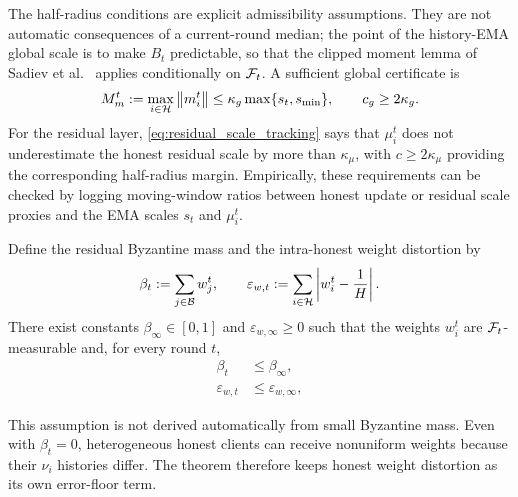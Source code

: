 \begin{remark}
\label{rem:avg_clip_budget}
The half-radius conditions are explicit admissibility assumptions. They are
not automatic consequences of a current-round median; the point of the
history-EMA global scale is to make \(B_t\) predictable, so that the clipped
moment lemma of Sadiev et al.~\cite[Lemma~5.1]{sadiev2023highprob} applies
conditionally on \(\mathcal{F}_t\). A sufficient global certificate is
\[
    M_m^t:=\max_{i\in\mathcal{H}}\left\lVert m_i^t \right\rVert
    \le \kappa_g\max\{s_t,s_{\min}\},
    \qquad
    c_g\ge 2\kappa_g .
\]
For the residual layer, \eqref{eq:residual_scale_tracking} says that
\(\mu_i^t\) does not underestimate the honest residual scale by more than
\(\kappa_\mu\), with \(c\ge2\kappa_\mu\) providing the corresponding
half-radius margin. Empirically, these requirements can be checked by logging
moving-window ratios between honest update or residual scale proxies and the
EMA scales \(s_t\) and \(\mu_i^t\).
\end{remark}

\begin{assumption}
\label{ass:beta_infty}
Define the residual Byzantine mass and the intra-honest weight distortion by
\begin{equation}
    \beta_t:=\sum_{j\in\mathcal{B}}w_j^t,
    \qquad
    \varepsilon_{w,t}
    :=
    \sum_{i\in\mathcal{H}}\left|w_i^t-\frac1H\right|.
    \label{eq:beta_epsw_def}
\end{equation}
There exist constants \(\beta_\infty\in[0,1]\) and
\(\varepsilon_{w,\infty}\ge 0\) such that the weights \(w_i^t\) are
\(\mathcal{F}_t\)-measurable and, for every round \(t\),
\begin{align}
    \beta_t &\le \beta_\infty,
    \label{eq:beta_infty}\\
    \varepsilon_{w,t} &\le \varepsilon_{w,\infty},
    \label{eq:epsw_beta_infty}
\end{align}
\end{assumption}

This assumption is not derived automatically from small Byzantine mass. Even
with \(\beta_t=0\), heterogeneous honest clients can receive nonuniform weights
because their \(\nu_i\) histories differ. The theorem therefore keeps honest
weight distortion as its own error-floor term.

